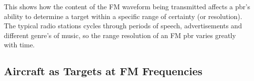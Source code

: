 This shows how the content of the FM waveform being transmitted affects a \gls{pbr}'s ability to determine a target within a specific range of certainty (or resolution). The typical radio stations cycles through periods of speech, advertisements and different genre's of music, so the range resolution of an FM \gls{pbr} varies greatly with time.


\subsection{Aircraft as Targets at FM Frequencies}
\label{subsec:ch2.pbr.aircraft}



